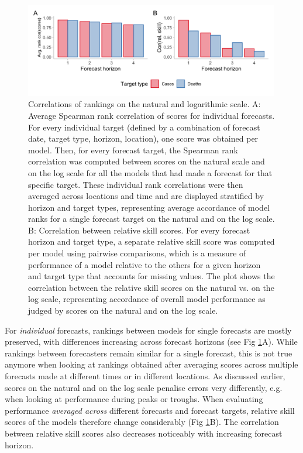 \documentclass[10pt,letterpaper]{article}
\begin{document}
\begin{figure}[h!]
    \centering
    \includegraphics[width=0.99\textwidth]{../output/figures/HUB-correlations.png}
    \caption{Correlations of rankings on the natural and logarithmic scale. A: Average Spearman rank correlation of scores for individual forecasts. For every individual target (defined by a combination of forecast date, target type, horizon, location), one score was obtained per model. Then, for every forecast target, the Spearman rank correlation was computed between scores on the natural scale and on the log scale for all the models that had made a forecast for that specific target. These individual rank correlations were then averaged across locations and time and are displayed stratified by horizon and target types, representing average accordance of model ranks for a single forecast target on the natural and on the log scale. B: Correlation between relative skill scores. For every forecast horizon and target type, a separate relative skill score was computed per model using pairwise comparisons, which is a measure of performance of a model relative to the others for a given horizon and target type that accounts for missing values. The plot shows the correlation between the relative skill scores on the natural vs. on the log scale, representing accordance of overall model performance as judged by scores on the natural and on the log scale.}
    \label{fig:HUB-cors}
\end{figure}

For \textit{individual} forecasts, rankings between models for single forecasts are mostly preserved, with differences increasing across forecast horizons (see Fig \ref{fig:HUB-cors}A). While rankings between forecasters remain similar for a single forecast, this is not true anymore when looking at rankings obtained after averaging scores across multiple forecasts made at different times or in different locations. As discussed earlier, scores on the natural and on the log scale penalise errors very differently, e.g. when looking at performance during peaks or troughs. When evaluating performance \textit{averaged across} different forecasts and forecast targets, relative skill scores of the models therefore change considerably (Fig \ref{fig:HUB-cors}B). The correlation between relative skill scores also decreases noticeably with increasing forecast horizon. 
\end{document}
